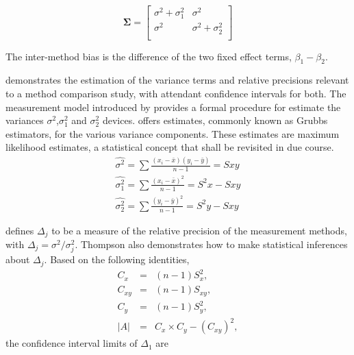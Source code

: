 \documentclass[12pt, a4paper]{article}
\begin{document}
	\[
	\boldsymbol{\Sigma} = \left[
	\begin{array}{cc}
	\sigma^{2} + \sigma^{2}_{1} & \sigma^{2} \\
	\sigma^{2} & \sigma^{2} + \sigma^{2}_{2} \\
	\end{array}
	\right]
	\]
	
	The inter-method bias is the difference of the two fixed effect terms, $\beta_{1}-\beta_{2}$.
	
	\citet{Kinsella} demonstrates the estimation of the variance terms and relative precisions relevant to a method comparison study, with attendant confidence intervals for both. The measurement model introduced by \citet{Grubbs48,Grubbs73} provides a formal procedure for estimate the variances $\sigma^2$,$\sigma^2_{1}$ and $\sigma^2_{2}$ devices. \citet{Grubbs48} offers estimates, commonly known as Grubbs estimators, for the various variance components. These estimates are maximum likelihood estimates, a statistical concept that shall be revisited in due course.
	\begin{eqnarray*}
		\hat{\sigma^{2}} = \sum{\frac{(x_{i}-\bar{x})(y_{i}-\bar{y})}{n-1}} = Sxy\\
		\hat{\sigma^{2}_{1}} = \sum{\frac{(x_{i}-\bar{x})^{2}}{n-1}} =S^{2}x - Sxy  \\
		\hat{\sigma^{2}_{2}} =
		\sum{\frac{(y_{i}-\bar{y})^{2}}{n-1}} = S^{2}y - Sxy
	\end{eqnarray*}
	
	
	\citet{Thompson} defines $\Delta_{j}$ to be a measure of the
	relative precision of the measurement methods, with $\Delta_{j}=
	\sigma^2/\sigma^2_{j}$. Thompson also demonstrates how to make statistical inferences about $\Delta_{j}$.
	Based on the following identities,
	\begin{eqnarray*}
		C_{x}&=&(n-1)S^2_{x},\nonumber\\
		C_{xy}&=&(n-1)S_{xy},\nonumber\\
		C_{y}&=&(n-1)S^2_{y},\nonumber\\
		|A| &=& C_{x}\times C_{y} - (C_{xy})^2,\nonumber
	\end{eqnarray*}
	\noindent the confidence interval limits of $\Delta_{1}$ are
	
\end{document}
